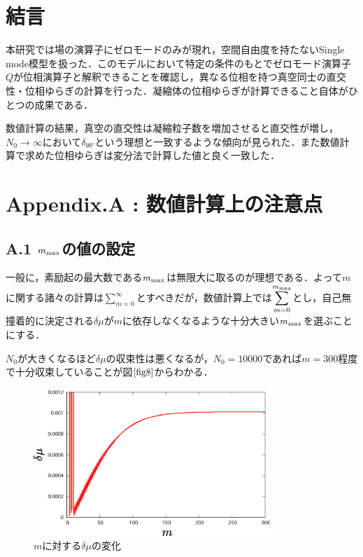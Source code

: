 \documentclass[10.5pt,a4paper]{jreport}
\def\theequation{\thechapter.\arabic{equation}}
\begin{document}
\section{結言}
本研究では場の演算子にゼロモードのみが現れ，空間自由度を持たないSingle mode模型を扱った．このモデルにおいて特定の条件のもとでゼロモード演算子$Q$が位相演算子と解釈できることを確認し，異なる位相を持つ真空同士の直交性・位相ゆらぎの計算を行った．凝縮体の位相ゆらぎが計算できること自体がひとつの成果である．

数値計算の結果，真空の直交性は凝縮粒子数を増加させると直交性が増し，$N_0 \rightarrow \infty$において$\delta_{\theta\theta'}$という理想と一致するような傾向が見られた．また数値計算で求めた位相ゆらぎは変分法で計算した値と良く一致した．
\section*{Appendix.A : 数値計算上の注意点}
\renewcommand{\theequation}{A.\arabic{equation}}
\subsection*{A.1  $m_{\rm max}$の値の設定}
一般に，素励起の最大数である$m_{\rm max}$は無限大に取るのが理想である．よって$m$に関する諸々の計算は$ \displaystyle \sum_{m=0}^{\infty}$とすべきだが，数値計算上では$ \displaystyle \sum_{m=0}^{m_{\rm max}}$とし，自己無撞着的に決定される$\delta \mu$が$m$に依存しなくなるような十分大きい$m_{\rm max}$を選ぶことにする．

$N_0$が大きくなるほど$\delta \mu$の収束性は悪くなるが，$N_0 = 10000$であれば$m=300$程度で十分収束していることが図$\ref{fig8}$からわかる．
\begin{figure}[htbp]
  \centering
  \includegraphics[width = 9cm]{./EPS/fig8.eps}
  \caption{$m$に対する$\delta \mu$の変化}
  \label{fig8}
\end{figure}
\end{document}
